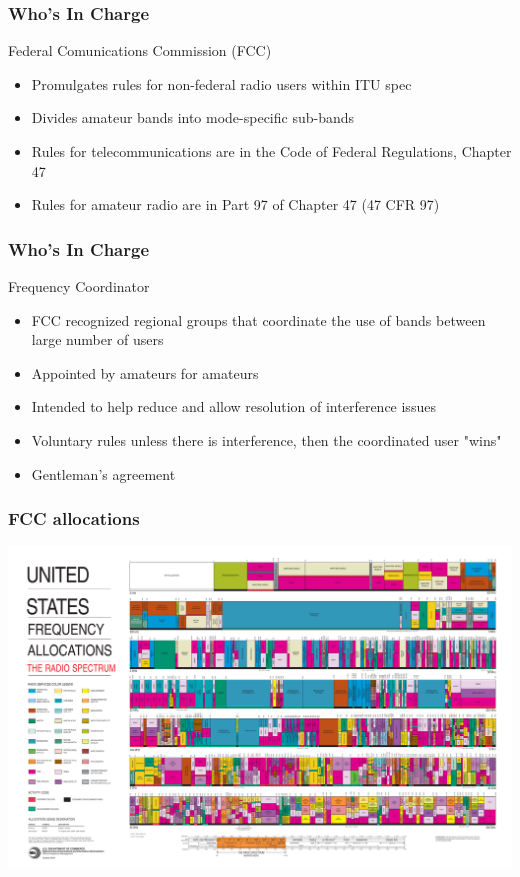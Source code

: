 \documentclass[12pt]{beamer}
\begin{document}
\begin{frame}
\frametitle{Who's In Charge}
Federal Comunications Commission (FCC)
\begin{itemize}
\item Promulgates  rules for non-federal radio users within ITU spec
\item Divides amateur bands into mode-specific sub-bands
\item Rules for telecommunications are in the Code of Federal Regulations, Chapter 47
\item Rules for amateur radio are in Part 97 of Chapter 47 (47 CFR 97)
\end{itemize}
\end{frame}

\begin{frame}
\frametitle{Who's In Charge}
Frequency Coordinator
\begin{itemize}
\item FCC recognized regional groups that coordinate the use of bands between large number of users \pause
\item Appointed by amateurs for amateurs \pause
\item Intended to help reduce and allow resolution of interference issues \pause
\item Voluntary rules unless there is interference, then the coordinated user "wins"\pause
\item Gentleman's agreement
\end{itemize}
\end{frame}

\begin{frame}
\frametitle{FCC allocations}
\begin{center}
\includegraphics[width=\textwidth]{2003-allochrt.pdf}
\end{center}
\end{frame}
\end{document}
